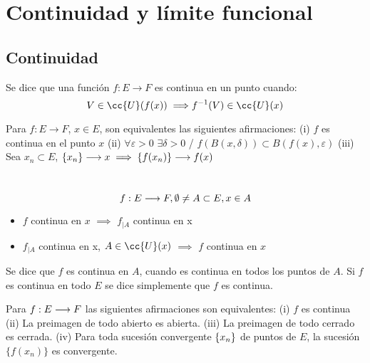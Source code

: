 \chapter{Continuidad y límite funcional}
\section{Continuidad}

\begin{definicion}
    Se dice que una función $f:E \longrightarrow F$ es continua en un punto cuando:
    $$V \in \cc{U}(f(x)) \\ \implies \\ f^{-1}(V) \in \cc{U}(x)$$
\end{definicion}

\begin{prop}[Caracterizacion]
    Para $f:E \longrightarrow F$, $x\in E$, son equivalentes las siguientes afirmaciones:\newline
    (i)  $f$ es continua en el punto $x$\newline
    (ii)  $\forall \varepsilon > 0$  $\exists \delta > 0$  / $f(B(x,\delta)) \subset B(f(x), \varepsilon)$\newline
    (iii)  Sea ${x_n} \subset E$, $\{x_n\} \longrightarrow x  \implies \{f(x_n)\} \longrightarrow f(x)$
\end{prop}

\begin{prop}\\
    $$f:E \longrightarrow F, \\ \emptyset \neq A \subset E, \\ x \in A$$
    \begin{itemize}
        \item $f$ continua en $x$ $\implies$ $f_{|A}$ continua en x
        \item $f_{|A}$ continua en x, $A \in \cc{U}(x)$ $\implies$ $f$ continua en $x$
    \end{itemize}
\end{prop}

\begin{definicion}
    Se dice que $f$ es continua en $A$, cuando es continua en todos los puntos de $A$. Si $f$ es continua en todo $E$ se dice simplemente que $f$ es continua.
\end{definicion}

\begin{prop}[Caracterización]
    Para $f:E \longrightarrow F$ las siguientes afirmaciones son equivalentes:\newline
    (i)  $f$ es continua \newline
    (ii)  La preimagen de todo abierto es abierta. \newline
    (iii)  La preimagen de todo cerrado es cerrada. \newline
    (iv)  Para toda sucesión convergente $\{x_n\}$ de puntos de $E$, la sucesión $\{f(x_n)\}$ es convergente.
\end{prop}

